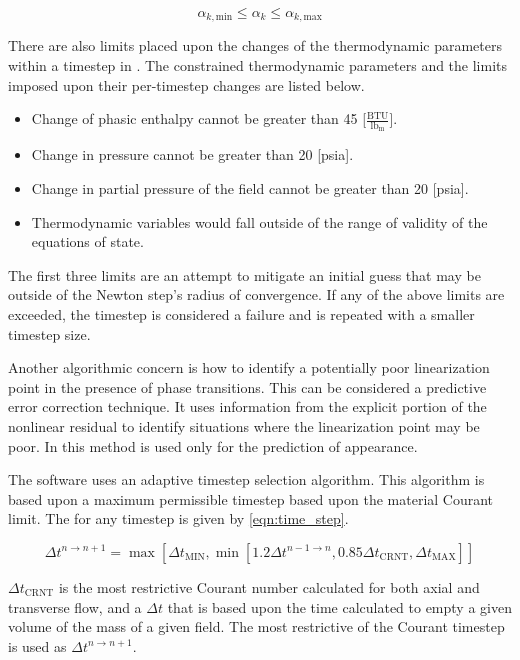 \begin{equation}
\label{eqn:volume_fraction}
\alpha_{k,\text{min}} \leq \alpha_k \leq \alpha_{k,\text{max}} 
\end{equation}

There are also limits placed upon the changes of the thermodynamic parameters within a timestep in \cobra{}.
The constrained thermodynamic parameters and the limits imposed upon their per-timestep changes are listed below.

\begin{itemize}
\item{Change of phasic enthalpy cannot be greater than 45 [$\frac{\text{BTU}}{\text{lb}_{\text{m}}}$].}
\item{Change in pressure cannot be greater than 20 [psia].}
\item{Change in partial pressure of the \ncg field cannot be greater than 20 [psia].}
\item{Thermodynamic variables would fall outside of the range of validity of the equations of state.}
\end{itemize}

The first three limits are an attempt to mitigate an initial guess that may be outside of the Newton step's radius of convergence.
If any of the above limits are exceeded, the timestep is considered a failure and is repeated with a smaller timestep size.

Another algorithmic concern is how to identify a potentially poor linearization point in the presence of phase transitions. 
This can be considered a predictive error correction technique.
It uses information from the explicit portion of the nonlinear residual to identify situations where the linearization point may be poor.
In \cobra{} this method is used only for the prediction of \ncg{} appearance.

The \cobra{} software uses an adaptive timestep selection algorithm.
This algorithm is based upon a maximum permissible timestep based upon the material Courant limit.
The \dt{} for any timestep is given by \eqref{eqn:time_step}.

\begin{equation}
\label{eqn:time_step}
\Delta t^{n \rightarrow n+1} = \max\left[ \Delta t_{\text{MIN}}, \min\left[1.2 \Delta t^{n-1 \rightarrow n}, 0.85 \Delta t_{\text{CRNT}}, \Delta t_{\text{MAX}} \right]\right]
\end{equation}

$\Delta t_{\text{CRNT}}$ is the most restrictive Courant number calculated for both axial and transverse flow, and a $\Delta t$ that is based upon the time calculated to empty a given volume of the mass of a given field.
The most restrictive of the Courant timestep is used as $\Delta t^{n \rightarrow n+1}$.

